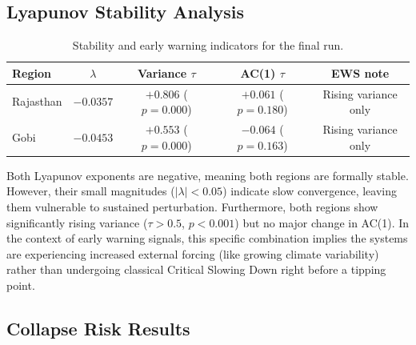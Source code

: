 \documentclass[12pt, a4paper]{article}
\begin{document}

\subsection{Lyapunov Stability Analysis}

\begin{table}[H]
\centering
\caption{Stability and early warning indicators for the final run.}
\label{tab:lyapunov}
\begin{tabular}{p{3.0cm}cccc}
\toprule
\textbf{Region} & \textbf{$\lambda$} & \textbf{Variance $\tau$} & \textbf{AC(1) $\tau$} & \textbf{EWS note} \\
\midrule
Rajasthan & $-0.0357$ & $+0.806$ ($p=0.000$) & $+0.061$ ($p=0.180$) & Rising variance only \\
Gobi      & $-0.0453$ & $+0.553$ ($p=0.000$) & $-0.064$ ($p=0.163$) & Rising variance only \\
\bottomrule
\end{tabular}
\end{table}

Both Lyapunov exponents are negative, meaning both regions are formally stable. However, their small magnitudes ($|\lambda| < 0.05$) indicate slow convergence, leaving them vulnerable to sustained perturbation. Furthermore, both regions show significantly rising variance ($\tau > 0.5$, $p < 0.001$) but no major change in AC(1). In the context of early warning signals, this specific combination implies the systems are experiencing increased external forcing (like growing climate variability) rather than undergoing classical Critical Slowing Down right before a tipping point.

\subsection{Collapse Risk Results}
\end{document}
